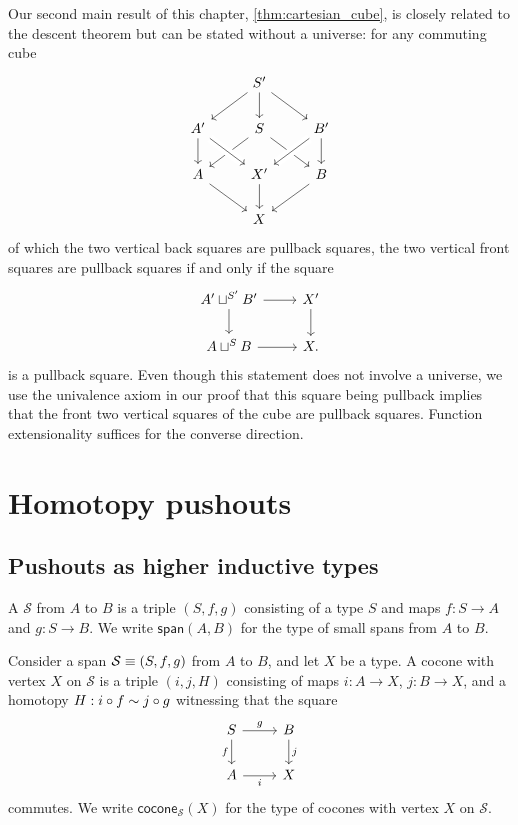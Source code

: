 Our second main result of this chapter, \cref{thm:cartesian_cube}, is closely related to the descent theorem but can be stated without a universe: for any commuting cube
\begin{equation*}
\begin{tikzcd}
& S' \arrow[dl] \arrow[dr] \arrow[d] \\
A' \arrow[d] & S \arrow[dl] \arrow[dr] & B' \arrow[dl,crossing over] \arrow[d] \\
A \arrow[dr] & X' \arrow[d] \arrow[from=ul,crossing over] & B \arrow[dl] \\
& X
\end{tikzcd}
\end{equation*}
of which the two vertical back squares are pullback squares, the two vertical front squares are pullback squares if and only if the square
\begin{equation*}
\begin{tikzcd}
A' \sqcup^{S'} B' \arrow[r] \arrow[d] & X' \arrow[d] \\
A\sqcup^{S} B \arrow[r] & X.
\end{tikzcd}
\end{equation*}
is a pullback square. Even though this statement does not involve a universe, we use the univalence axiom in our proof that this square being pullback implies that the front two vertical squares of the cube are pullback squares. Function extensionality suffices for the converse direction. 


\section{Homotopy pushouts}

\subsection{Pushouts as higher inductive types}

\begin{defn}
A  $\mathcal{S}$ from $A$ to $B$ is a triple $(S,f,g)$ consisting of a type $S$ and maps $f:S\to A$ and $g:S\to B$. We write $\mathsf{span}(A,B)$ for the type of small spans from $A$ to $B$. 
\end{defn}

\begin{defn}
Consider a span $\mathcal{S}\equiv (S,f,g)$ from $A$ to $B$, and let $X$ be a type. A cocone with vertex $X$ on $\mathcal{S}$ is a triple $(i,j,H)$ consisting of maps $i:A\to X$, $j:B\to X$, and a homotopy $H:i\circ f\sim j\circ g$ witnessing that the square
\begin{equation*}
\begin{tikzcd}
S \arrow[d,swap,"f"] \arrow[r,"g"] & B \arrow[d,"j"] \\
A \arrow[r,swap,"i"] & X
\end{tikzcd}
\end{equation*}
commutes. We write $\mathsf{cocone}_{\mathcal{S}}(X)$ for the type of cocones with vertex $X$ on $\mathcal{S}$. 
\end{defn}

